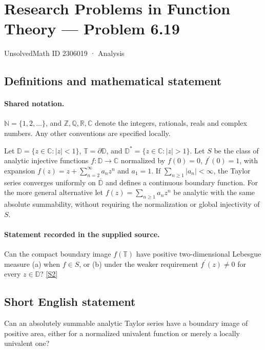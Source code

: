 \documentclass[11pt]{book}
\newcommand{\sref}[2]{\hyperlink{source:#1:#2}{[S#2]}}
\begin{document}
\setcounter{section}{2306018}
\section{Research Problems in Function Theory — Problem 6.19}\label{2306019}
{\small\sffamily UnsolvedMath ID 2306019 · Analysis}
\subsection{Definitions and mathematical statement}

\paragraph{Shared notation.}$\mathbb N=\{1,2,\ldots\}$, and $\mathbb Z,\mathbb Q,\mathbb R,\mathbb C$ denote the integers, rationals, reals and complex numbers. Any other conventions are specified locally.


Let $\mathbb D=\{z\in\mathbb C:|z|<1\}$, $\mathbb T=\partial\mathbb D$, and $\mathbb D^*=\{z\in\mathbb C:|z|>1\}$. Let $S$ be the class of analytic injective functions $f:\mathbb D\to\mathbb C$ normalized by $f(0)=0$, $f^{\prime}(0)=1$, with expansion $f(z)=z+\sum_{n=2}^{\infty}a_nz^n$ and $a_1=1$. If $\sum_{n\ge1}|a_n|<\infty$, the Taylor series converges uniformly on $\overline{\mathbb D}$ and defines a continuous boundary function. For the more general alternative let $f(z)=\sum_{n\ge1}a_nz^n$ be analytic with the same absolute summability, without requiring the normalization or global injectivity of $S$.
\paragraph{Statement recorded in the supplied source.}
Can the compact boundary image $f(\mathbb T)$ have positive two-dimensional Lebesgue measure (a) when $f\in S$, or (b) under the weaker requirement $f^{\prime}(z)\ne0$ for every $z\in\mathbb D$? \sref{2306019}{2}
\subsection{Short English statement}
Can an absolutely summable analytic Taylor series have a boundary image of positive area, either for a normalized univalent function or merely a locally univalent one?
\end{document}
